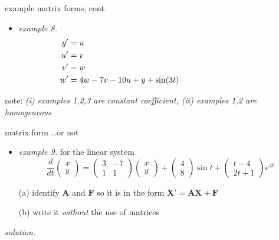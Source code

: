 \documentclass[urlcolor=blue,dvipsnames]{beamer}
\newcommand{\bA}{\mathbf{A}}
\newcommand{\bF}{\mathbf{F}}
\newcommand{\bX}{\mathbf{X}}
\begin{document}
\begin{frame}{example matrix forms, cont.}

\small
\begin{itemize}
\item \emph{example 8.}
\begin{align*}
y' &= u \hspace{75mm} \\
u' &= v \\
v' &= w \\
w' &= 4w-7v-10u+y+\sin(3t)
\end{align*}
\end{itemize}

\vspace{30mm}
\scriptsize note: \emph{(i) examples 1,2,3 are constant coefficient, (ii) examples 1,2 are homogeneous}
\end{frame}


\begin{frame}{matrix form \dots or not}

\begin{itemize}
\item \emph{example 9.}  for the linear system
    $$\frac{d}{dt} \begin{pmatrix} x \\ y \end{pmatrix} =  \begin{pmatrix} 3 & -7 \\ 1 & 1 \end{pmatrix} \begin{pmatrix} x \\ y \end{pmatrix} + \begin{pmatrix} 4 \\ 8 \end{pmatrix} \sin t + \begin{pmatrix} t-4 \\ 2t+1 \end{pmatrix} e^{4t}$$

(a) identify $\bA$ and $\bF$ so it is in the form $\bX'=\bA\bX+\bF$

(b) write it \emph{without} the use of matrices
\end{itemize}

\noindent \emph{solution.}

\vspace{50mm}
\end{frame}
\end{document}
